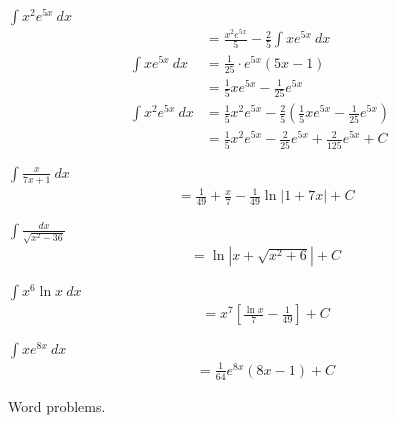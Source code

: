 \documentclass[12pt]{article}
\newenvironment{problem}[2][]{
    \begin{trivlist}
        \item[
            {\bfseries #1}
            {\bfseries #2.}
        ]
}{\end{trivlist}}
\newcommand{\descprob}[1]{\hfill\break #1}
\begin{document}
\begin{problem}{35}
$\displaystyle\int x^2 e^{5x} ~ dx$
\begin{align}
&= \frac{x^2 e^{5x}}{5} - \frac{2}{5} \int x e^{5x} ~ dx \\
\int x e^{5x} ~ dx &= \frac{1}{25} \cdot e^{5x} \left(5x - 1\right) \\
&= \frac{1}{5} x e^{5x} - \frac{1}{25} e^{5x} \\
\int x^2 e^{5x} ~ dx &= \frac{1}{5} x^2 e^{5x} - \frac{2}{5} \left(\frac{1}{5} x e^{5x} - \frac{1}{25} e^{5x}\right) \\
&= \frac{1}{5} x^2 e^{5x} - \frac{2}{25} e^{5x} + \frac{2}{125} e^{5x} + C
\end{align}
\end{problem}

\begin{problem}{36}
$\displaystyle\int \frac{x}{7x + 1} ~ dx$
\begin{align}
&= \frac{1}{49} + \frac{x}{7} - \frac{1}{49} \ln \left|1 + 7x\right| + C
\end{align}
\end{problem}

\begin{problem}{37}
$\displaystyle\int \frac{dx}{\sqrt{x^2 - 36}}$
\begin{align}
&= \ln \left|x + \sqrt{x^2 + 6}\right| + C
\end{align}
\end{problem}

\begin{problem}{38}
$\displaystyle\int x^6 \ln x ~ dx$
\begin{align}
&= x^7 \left[\frac{\ln x}{7} - \frac{1}{49}\right] + C
\end{align}
\end{problem}

\begin{problem}{39}
$\displaystyle\int xe^{8x} ~ dx$
\begin{align}
&= \frac{1}{64} e^{8x} \left(8x - 1\right) + C
\end{align}
\end{problem}

\descprob{Word problems.}
\end{document}
